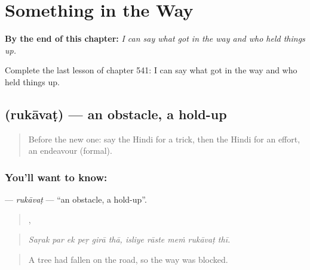 
\chapter{Something in the Way}
\label{ch:hi-something-in-the-way}

\begin{chapteropening}
\textbf{By the end of this chapter:} \emph{I can say what got in the way and who held things up.}

Complete the last lesson of chapter 541: I can say what got in the way and who held things up.
\end{chapteropening}

\section[\texorpdfstring{\hi{रुकावट} (rukāvaṭ)}{रुकावट (rukāvaṭ)}]{ (rukāvaṭ) — an obstacle, a hold-up}

\label{lesson:HI-C541-rukavat}



\begin{quote}
Before the new one: say the Hindi for a trick, then the Hindi for an effort, an endeavour (formal).
\end{quote}

\subsection*{You'll want to know: }
\textbf{} — \emph{rukāvaṭ} — \textquotedblleft{}an obstacle, a hold-up\textquotedblright{}.

\begin{quote}
     ,     
\end{quote}

\begin{quote}
\emph{Saṛak par ek peṛ girā thā, isliye rāste meṁ rukāvaṭ thī.}
\end{quote}

\begin{quote}
A tree had fallen on the road, so the way was blocked.
\end{quote}


